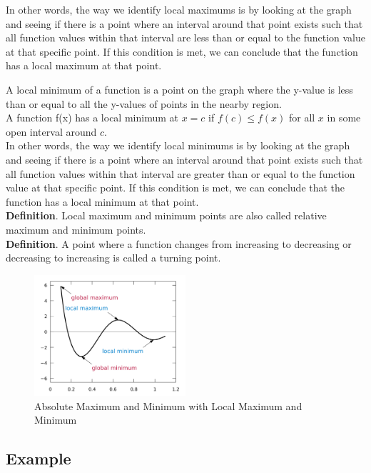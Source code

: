 In other words, the way we identify local maximums is by looking at the graph and seeing if there is a point where an interval around that point exists such that all function values within that interval are less than or equal to the function value at that specific point. If this condition is met, we can conclude that the function has a local maximum at that point.

A local minimum of a function is a point on the graph where the y-value is less than or equal to all the y-values of points in the nearby region. \\
A function f(x) has a local minimum at $x = c$ if $f(c) \le f(x)$ for all $x$ in some open interval around $c$. \\
In other words, the way we identify local minimums is by looking at the graph and seeing if there is a point where an interval around that point exists such that all function values within that interval are greater than or equal to the function value at that specific point. If this condition is met, we can conclude that the function has a local minimum at that point. \\

\textbf{Definition}. Local maximum and minimum points are also called relative maximum and minimum points. \\
\textbf{Definition}. A point where a function changes from increasing to decreasing or decreasing to increasing is called a turning point. \\

\newpage
\begin{figure}
	\centering
	\includegraphics[width=0.5\textwidth]{algebra-pre-calculus/functions/graph7.png}
	\caption{Absolute Maximum and Minimum with Local Maximum and Minimum}
\end{figure}

\subsection{Example}


